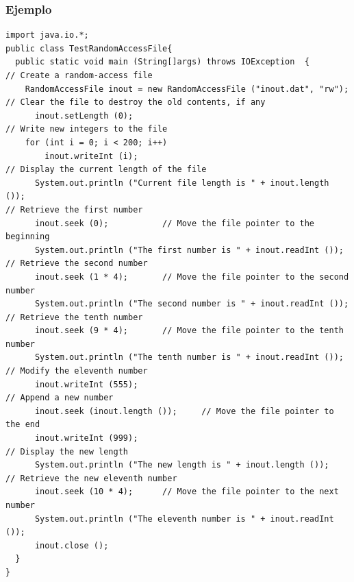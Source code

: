 \documentclass{beamer}
\begin{document}
\begin{frame}[fragile]
\frametitle{Ejemplo}
\begin{tiny}
\begin{verbatim}
import java.io.*;
public class TestRandomAccessFile{
  public static void main (String[]args) throws IOException  {
// Create a random-access file
    RandomAccessFile inout = new RandomAccessFile ("inout.dat", "rw");
// Clear the file to destroy the old contents, if any
      inout.setLength (0);
// Write new integers to the file
    for (int i = 0; i < 200; i++)
        inout.writeInt (i);
// Display the current length of the file
      System.out.println ("Current file length is " + inout.length ());
// Retrieve the first number
      inout.seek (0);           // Move the file pointer to the beginning
      System.out.println ("The first number is " + inout.readInt ());
// Retrieve the second number
      inout.seek (1 * 4);       // Move the file pointer to the second number
      System.out.println ("The second number is " + inout.readInt ());
// Retrieve the tenth number
      inout.seek (9 * 4);       // Move the file pointer to the tenth number
      System.out.println ("The tenth number is " + inout.readInt ());
// Modify the eleventh number
      inout.writeInt (555);
// Append a new number
      inout.seek (inout.length ());     // Move the file pointer to the end
      inout.writeInt (999);
// Display the new length
      System.out.println ("The new length is " + inout.length ());
// Retrieve the new eleventh number
      inout.seek (10 * 4);      // Move the file pointer to the next number
      System.out.println ("The eleventh number is " + inout.readInt ());
      inout.close ();
  }
}
\end{verbatim}
\end{tiny}
\end{frame}
\end{document}
